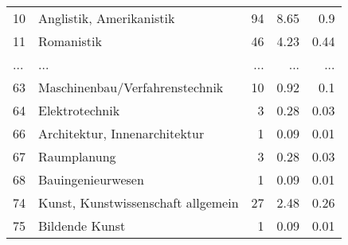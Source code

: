 \begin{longtable}{lXrrr}
        10 & \multicolumn{1}{X}{Anglistik, Amerikanistik} & %
          \num{94} &
          \num[round-mode=places,round-precision=2]{8,65} &
          \num[round-mode=places,round-precision=2]{0,9} \\
        11 & \multicolumn{1}{X}{Romanistik} & %
          \num{46} &
          \num[round-mode=places,round-precision=2]{4,23} &
          \num[round-mode=places,round-precision=2]{0,44} \\
       ... & ... & ... & ... & ... \\
        63 & \multicolumn{1}{X}{Maschinenbau/Verfahrenstechnik} & %
          \num{10} &
          \num[round-mode=places,round-precision=2]{0,92} &
          \num[round-mode=places,round-precision=2]{0,1} \\

        64 & \multicolumn{1}{X}{Elektrotechnik} & %
          \num{3} &
          \num[round-mode=places,round-precision=2]{0,28} &
          \num[round-mode=places,round-precision=2]{0,03} \\

        66 & \multicolumn{1}{X}{Architektur, Innenarchitektur} & %
          \num{1} &
          \num[round-mode=places,round-precision=2]{0,09} &
          \num[round-mode=places,round-precision=2]{0,01} \\

        67 & \multicolumn{1}{X}{Raumplanung} & %
          \num{3} &
          \num[round-mode=places,round-precision=2]{0,28} &
          \num[round-mode=places,round-precision=2]{0,03} \\

        68 & \multicolumn{1}{X}{Bauingenieurwesen} & %
          \num{1} &
          \num[round-mode=places,round-precision=2]{0,09} &
          \num[round-mode=places,round-precision=2]{0,01} \\

        74 & \multicolumn{1}{X}{Kunst, Kunstwissenschaft allgemein} & %
          \num{27} &
          \num[round-mode=places,round-precision=2]{2,48} &
          \num[round-mode=places,round-precision=2]{0,26} \\

        75 & \multicolumn{1}{X}{Bildende Kunst} & %
          \num{1} &
          \num[round-mode=places,round-precision=2]{0,09} &
          \num[round-mode=places,round-precision=2]{0,01} \\


\end{longtable}
